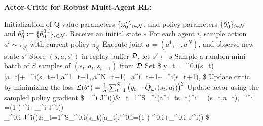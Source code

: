 \begin{algorithm}[thpb]
	\caption{\textbf{Actor-Critic for Robust Multi-Agent RL:} } 
	\label{alg:batch_AC}
	\begin{algorithmic}[1] 
		\STATE Initialization of Q-value parameters $\{\omega^i_0\}_{i\in\mathcal{N}}$, and policy parameters $\{\theta^i_0\}_{i\in\mathcal{N}}$ and $\theta^0_0:=\{\theta^{0,i}_0\}_{i\in\mathcal{N}}$.  
		\STATE Receive an initial state $s$ 
		\STATE For each agent $i$, sample action $a^i\sim \pi_{\theta^i_t}$ with current policy $ \pi_{\theta^i_t}$
		\STATE Execute joint $a=(a^1,\cdots,a^N)$, and observe 
		new state $s'$
		\STATE Store $(s,a,s')$ in replay buffer $\mathcal{D}$, let $s'\leftarrow s$
		\STATE Sample a random mini-batch of $S$ samples of $(s_t,a_t,s_{t+1})$ from $\mathcal{D}$
		\STATE Set  
		\$
		y_t=\pi_{\theta^{0,i}}(s_t)[a_t]+\gamma \oQ_{\omega^i}(s_{t+1},a^1_{t+1},\cdots,a^N_{t+1})\biggiven_{a^i_{t+1}\sim\pi_{\theta^i}(\cdot\given s_{t+1})},
		\$
		\STATE Update critic by minimizing the loss $\mathcal{L}(\theta^i)=\frac{1}{S}\sum_{t=1}^S\big(y_t-\bar{Q}_{\omega^i}(s_{t},a_{t})\big)^2$
		\STATE Update actor using the sampled policy gradient
		\$
		\nabla_{\theta^i} J^i(\theta)&\approx{}\sum_{t=1}^S\nabla\log\pi_{\theta^i}(a^i_t\given s_t)\oQ^i_{\tilde{\pi}_\theta}(s_t,a_t),~ 
		\theta'^i =(1-\tau) \theta^i+\tau\nabla_{\theta^i} J^i(\theta)\\
		\nabla_{\theta^{0,i}} J^i(\theta)&\approx{}\sum_{t=1}^S\nabla\pi_{\theta^{0,i}}(s_t)[a_t],\qquad\qquad\theta'^{0,i}=(1-\tau) \theta^{0,i}+\tau\nabla_{\theta^{0,i}} J^i(\theta)
		\$ 
		\ENDFOR
		\ENDFOR
		\ENDFOR
	\end{algorithmic}
\end{algorithm}
 


